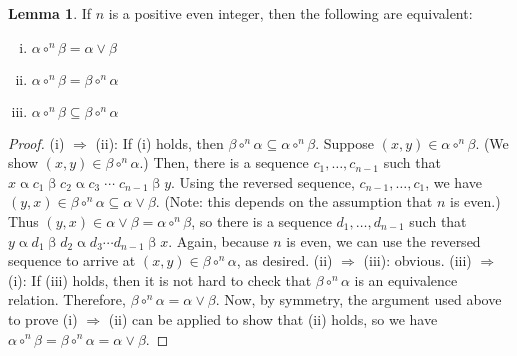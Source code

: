 \documentclass[11pt,reqno]{amsart}
\theoremstyle{plain}
\theoremstyle{definition}
\newtheorem{lemma}{Lemma}
\theoremstyle{remark}
\newcommand{\<}{\ensuremath{\langle}}
\renewcommand{\>}{\ensuremath{\rangle}}
\newcommand{\lb}{\ensuremath{\llbracket}}
\newcommand{\rb}{\ensuremath{\rrbracket}}
\newcommand{\rel}[1]{\ensuremath{\mathbin{#1}}}
\renewcommand{\leq}{\ensuremath{\leqslant}}
\newcommand{\join}{\ensuremath{\vee}}
\newcommand{\Eq}{\ensuremath{\operatorname{Eq}}}
\newcommand{\circn}{\ensuremath{\circ^{n}}}
\newcommand{\acb}{\ensuremath{\alpha \circn \beta}}
\newcommand{\bca}{\ensuremath{\beta \circn \alpha}}
\begin{document}
\vskip2mm
\begin{lemma}
\label{lemma:even-permuting-relations}
 If $n$ is a positive even integer, then the following are equivalent:
 \begin{enumerate}[(i)]
 \item $\alpha \circn \beta = \alpha \join \beta$
 \item $\alpha \circn \beta = \beta \circn \alpha$
 \item $\alpha \circn \beta \subseteq \beta \circn \alpha$
 \end{enumerate}
\end{lemma}
\begin{proof}
  (i) $\Rightarrow$ (ii):  If (i) holds, then $\beta \circn \alpha \subseteq
  \alpha \circn \beta$.  Suppose $(x,y) \in \alpha \circn \beta$.
  (We show $(x,y) \in \beta \circn \alpha$.)  Then, there
  is a sequence $c_1, \dots, c_{n-1}$ such that 
  $x \rel{\alpha} c_1 \rel{\beta} c_2 \rel{\alpha} c_3  \rel{\cdots} %
  c_{n-1} \rel{\beta} y$.  
  Using the reversed sequence, $c_{n-1}, \dots, c_1$, we have $(y,x) \in \bca
  \subseteq \alpha \join \beta$.  (Note: this depends on the 
  assumption that $n$ is even.)   Thus $(y,x) \in \alpha \join \beta = \acb$, so
  there is a sequence $d_1, \dots, d_{n-1}$ such that 
  $y \rel{\alpha} d_1 \rel{\beta} d_2 \rel{\alpha} d_3  \cdots %
  d_{n-1} \rel{\beta} x$.
  Again, because $n$ is even, we can use the reversed sequence to arrive
  at $(x,y) \in \bca$, as desired.
\vskip2mm
\noindent
  (ii) $\Rightarrow$ (iii):  obvious.
\vskip2mm
\noindent
  (iii) $\Rightarrow$ (i):  If (iii) holds, then it is not hard to check that
  $\bca$ is an equivalence relation.  Therefore, $\bca = \alpha \join \beta$.
  Now, by symmetry, the argument used above to prove (i) $\Rightarrow$ (ii) can
  be applied to show that (ii) holds, so we have $\acb = \bca = \alpha \join \beta$.

\end{proof}






\end{document}
